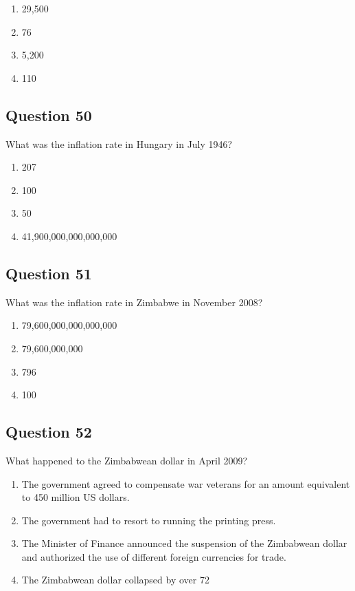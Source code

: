 \documentclass[12pt,a4paper]{article}
\begin{document}
\begin{enumerate}[label=\Alph*., leftmargin=*]
\item 29,500%
\item 76%
\item 5,200%
\item 110%
\end{enumerate}

\bigskip


\subsection*{Question 50}
What was the inflation rate in Hungary in July 1946?

\begin{enumerate}[label=\Alph*., leftmargin=*]
\item 207%
\item 100%
\item 50%
\item 41,900,000,000,000,000%
\end{enumerate}

\bigskip


\subsection*{Question 51}
What was the inflation rate in Zimbabwe in November 2008?

\begin{enumerate}[label=\Alph*., leftmargin=*]
\item 79,600,000,000,000,000%
\item 79,600,000,000%
\item 796%
\item 100%
\end{enumerate}

\bigskip


\subsection*{Question 52}
What happened to the Zimbabwean dollar in April 2009?

\begin{enumerate}[label=\Alph*., leftmargin=*]
\item The government agreed to compensate war veterans for an amount equivalent to 450 million US dollars.
\item The government had to resort to running the printing press.
\item The Minister of Finance announced the suspension of the Zimbabwean dollar and authorized the use of different foreign currencies for trade.
\item The Zimbabwean dollar collapsed by over 72%
\end{enumerate}
\end{document}
